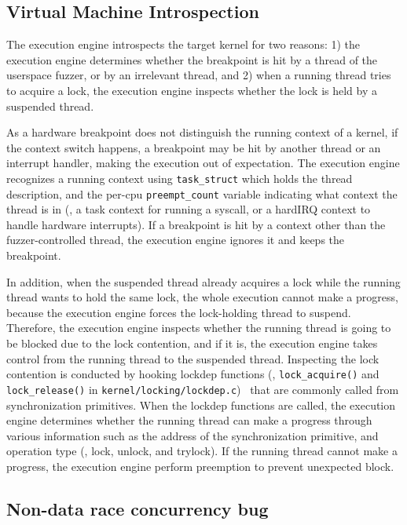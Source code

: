 \dr{}

\subsection{Virtual Machine Introspection}
\label{s:appendix:vmi}

The execution engine introspects the target kernel for two reasons: 1)
the execution engine determines whether the breakpoint is hit by a
thread of the userspace fuzzer, or by an irrelevant thread, and 2)
when a running thread tries to acquire a lock, the execution engine
inspects whether the lock is held by a suspended thread.

As a hardware breakpoint does not distinguish the running context of a
kernel, if the context switch happens, a breakpoint may be hit by
another thread or an interrupt handler, making the execution out of
expectation.
%
The execution engine recognizes a running context using
\texttt{task_struct} which holds the thread description, and the
per-cpu \texttt{preempt_count} variable indicating what context the
thread is in (\eg, a task context for running a syscall, or a hardIRQ
context to handle hardware interrupts).
%
If a breakpoint is hit by a context other than the fuzzer-controlled
thread, the execution engine ignores it and keeps the breakpoint.


In addition, when the suspended thread already acquires a lock while
the running thread wants to hold the same lock, the whole execution
cannot make a progress, because the execution engine forces the
lock-holding thread to suspend.
%
Therefore, the execution engine inspects whether the running thread is
going to be blocked due to the lock contention, and if it is, the
execution engine takes control from the running thread to the
suspended thread.
%
Inspecting the lock contention is conducted by hooking lockdep
functions (\ie, \texttt{lock_acquire()} and \texttt{lock_release()} in
\texttt{kernel/locking/lockdep.c})~\cite{lockdep} that are commonly
called from synchronization primitives.
%
When the lockdep functions are called, the execution engine determines
whether the running thread can make a progress through various
information such as the address of the synchronization primitive, and
operation type (\ie, lock, unlock, and trylock).
%
If the running thread cannot make a progress, the execution engine
perform preemption to prevent unexpected block.

\subsection{Non-data race concurrency bug}
\label{s:appendix:datarace}

